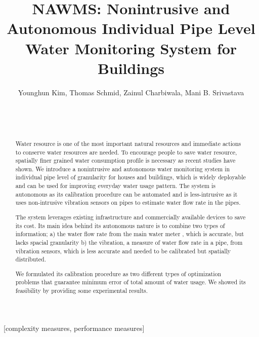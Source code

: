 \documentclass[10pt]{sigplan-proc-varsize}
\author{
      \alignauthor Younghun Kim, Thomas Schmid, Zainul Charbiwala, Mani B. Srivastava   \\  
%
%
%
      \sharedaffiliation
     \affaddr{Networked and Embedded Systems Lab.}  \\
     \affaddr{Electrical Engineering Department}  \\
      \affaddr{University of California, Los Angeles}\\
      \email{\{kimyh,thomas.schmid,zainul,mbs\}@ucla.edu}
    }
\title{NAWMS: Nonintrusive and Autonomous Individual Pipe Level Water Monitoring System for Buildings}
\begin{document}
\maketitle


\begin{abstract}
Water resource is one of the most important natural resources and immediate actions to conserve water resources are needed. To encourage people to save water resource, spatially finer grained water consumption profile is necessary as recent studies have shown. We introduce a nonintrusive and autonomous water monitoring system in individual pipe level of granularity for houses and buildings, which is widely deployable and can be used for improving everyday water usage pattern. The system is autonomous as its calibration procedure can be automated and is less-intrusive as it uses non-intrusive vibration sensors on pipes to estimate water flow rate in the pipes.

The system leverages existing infrastructure and commercially available devices to save its cost. Its main idea behind its autonomous nature is to combine two types of information; a) the water flow rate from the main water meter , which is accurate, but lacks spacial granularity b) the vibration, a measure of water flow rate in a pipe, from vibration sensors, which is less accurate and needed to be calibrated but spatially distributed.

We formulated its calibration procedure as two different types of optimization problems that guarantee minimum error of total amount of water usage. We showed its feasibility by providing some experimental results.

\end{abstract}

[complexity measures, performance measures]



















\end{document}
